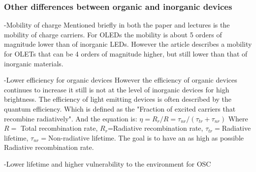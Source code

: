 \subsubsection{Other differences between organic and inorganic devices}
-Mobility of charge
Mentioned briefly in both the paper and lectures is the mobility of charge carriers. For OLEDs the mobility is about 5 orders of magnitude lower than of inorganic LEDs. However the article describes a mobility for OLETs that can be 4 orders of magnitude higher, but still lower than that of inorganic materials.

-Lower efficiency for organic devices
However the efficiency of organic devices continues to increase it still is not at the level of inorganic devices for high brightness. The efficiency of light emitting devices is often described by the quantum efficiency. Which is defined as the "Fraction of excited carriers that recombine radiatively". And the equation is: $\eta = R_{r}/R = \tau_{nr}/(\tau_{tr}+\tau_{nr})$ Where $R=$ Total recombination rate, $R_{r}$=Radiative recombination rate, $\tau_{tr}=$Radiative lifetime, $\tau_{nr}=$Non-radiative lifetime. The goal is to have an as high as possible Radiative recombination rate. 

-Lower lifetime and higher vulnerability to the environment for OSC
